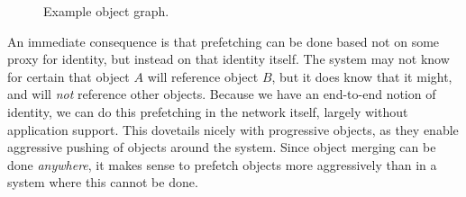 {    \begin{SCfigure}[t]
        \centering
        \caption{Example object graph.}
        \label{fig:ograph}
    \end{SCfigure}

    An immediate consequence is that prefetching can be done based not on some proxy for identity,
    but instead on that identity itself. The system may not know for certain that object $A$ will
    reference object $B$, but it does know that it might, and will \emph{not} reference other objects.
    Because we have an end-to-end notion of identity, we can do this prefetching in the network itself,
    largely without application support.
    This dovetails nicely with progressive objects, as they enable aggressive pushing of objects around
    the system. Since object merging can be done \emph{anywhere}, it makes sense to prefetch objects
    more aggressively than in a system where this cannot be done.

}


